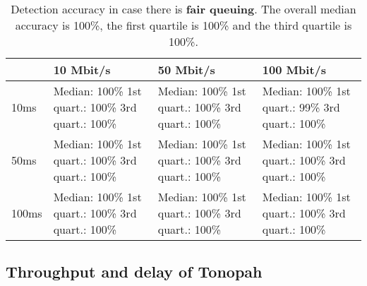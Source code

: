 \documentclass[conference]{IEEEtran}
\begin{document}
\begin{table}
\begin{tabularx}{\columnwidth}{| l | X | X | X |}
\hline
& 10 Mbit/s & 50 Mbit/s & 100 Mbit/s \\ \hline
10ms & Median: 100\% \newline 1st quart.: 100\% \newline 3rd quart.: 100\% & Median: 100\% \newline 1st quart.: 100\% \newline 3rd quart.: 100\% & Median: 100\% \newline 1st quart.: 99\% \newline 3rd quart.: 100\%\\ \hline
50ms & Median: 100\% \newline 1st quart.: 100\% \newline 3rd quart.: 100\% & Median: 100\% \newline 1st quart.: 100\% \newline 3rd quart.: 100\% & Median: 100\% \newline 1st quart.: 100\% \newline 3rd quart.: 100\% \\ \hline
100ms & Median: 100\% \newline 1st quart.: 100\% \newline 3rd quart.: 100\% & Median: 100\% \newline 1st quart.: 100\% \newline 3rd quart.: 100\% & Median: 100\% \newline 1st quart.: 100\% \newline 3rd quart.: 100\% \\ \hline
\end{tabularx}
\caption{Detection accuracy in case there is \textbf{fair queuing}.  The overall median accuracy is 100\%, the first quartile is 100\% and the third quartile is 100\%.}
\label{table:fq}
\end{table}    

\subsection{Throughput and delay of Tonopah}
\end{document}
